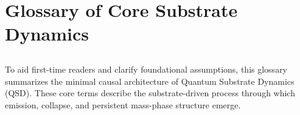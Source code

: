 \documentclass[preprints,article,submit,pdftex,moreauthors]{Definitions/mdpi}
\begin{document}
\appendixstart
\appendix
\section[\appendixname~\thesection]{Glossary of Core Substrate Dynamics}
\label{app:glossary}
\subsection[\appendixname~\thesubsection]{}

To aid first-time readers and clarify foundational assumptions, this glossary summarizes the minimal causal architecture of Quantum Substrate Dynamics (QSD). These core terms describe the substrate-driven process through which emission, collapse, and persistent mass-phase structure emerge.
\end{document}
